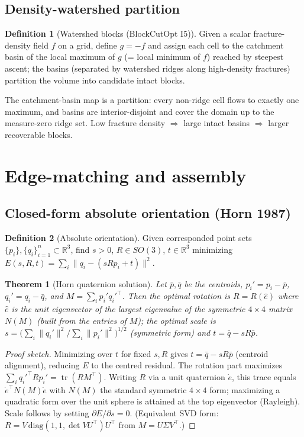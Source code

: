 \documentclass[11pt]{article}
\theoremstyle{definition}\newtheorem{definition}{Definition}[section]
\theoremstyle{plain}\newtheorem{theorem}{Theorem}[section]
\newcommand{\R}{\mathbb{R}}\newcommand{\Z}{\mathbb{Z}}\newcommand{\Norm}[1]{\lVert #1\rVert}
\begin{document}
\subsection{Density-watershed partition}
\begin{definition}[Watershed blocks (BlockCutOpt I5)]
Given a scalar fracture-density field $f$ on a grid, define $g=-f$ and assign each cell to the catchment
basin of the local maximum of $g$ (= local minimum of $f$) reached by steepest ascent; the basins (separated
by watershed ridges along high-density fractures) partition the volume into candidate intact blocks.
\end{definition}
\begin{proposition}
The catchment-basin map is a partition: every non-ridge cell flows to exactly one maximum, and basins are
interior-disjoint and cover the domain up to the measure-zero ridge set. Low fracture density $\Rightarrow$
large intact basins $\Rightarrow$ larger recoverable blocks.
\end{proposition}

\section{Edge-matching and assembly}
\subsection{Closed-form absolute orientation (Horn 1987)}
\begin{definition}[Absolute orientation]
Given corresponded point sets $\{p_i\},\{q_i\}_{i=1}^n\subset\R^3$, find $s>0$, $R\in SO(3)$, $t\in\R^3$
minimizing $E(s,R,t)=\sum_i\Norm{q_i-(sRp_i+t)}^2$.
\end{definition}
\begin{theorem}[Horn quaternion solution]\label{thm:horn}
Let $\bar p,\bar q$ be the centroids, $p_i'=p_i-\bar p$, $q_i'=q_i-\bar q$, and
$M=\sum_i p_i' q_i'^\top$. Then the optimal rotation is $R=R(\hat e)$ where $\hat e$ is the unit eigenvector of
the largest eigenvalue of the symmetric $4\times4$ matrix $N(M)$ (built from the entries of $M$); the optimal
scale is $s=\big(\sum_i\Norm{q_i'}^2/\sum_i\Norm{p_i'}^2\big)^{1/2}$ (symmetric form) and $t=\bar q-sR\bar p$.
\end{theorem}
\begin{proof}[Proof sketch]
Minimizing over $t$ for fixed $s,R$ gives $t=\bar q-sR\bar p$ (centroid alignment), reducing $E$ to the
centred residual. The rotation part maximizes $\sum_i q_i'^\top R p_i'=\operatorname{tr}(R M^\top)$. Writing
$R$ via a unit quaternion $\dot e$, this trace equals $\dot e^\top N(M)\dot e$ with $N(M)$ the standard
symmetric $4\times4$ form; maximizing a quadratic form over the unit sphere is attained at the top eigenvector
(Rayleigh). Scale follows by setting $\partial E/\partial s=0$. (Equivalent SVD form: $R=V\,\mathrm{diag}(1,1,\det VU^\top)U^\top$ from $M=U\Sigma V^\top$.)
\end{proof}
\end{document}
